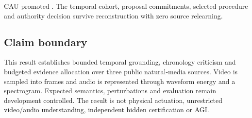 CAU promoted
.
The temporal cohort, proposal commitments, selected procedure and authority
decision survive reconstruction with zero source relearning.

\subsection{Claim boundary}

This result establishes bounded temporal grounding, chronology criticism and
budgeted evidence allocation over three public natural-media sources.  Video is
sampled into frames and audio is represented through waveform energy and a
spectrogram.  Expected semantics, perturbations and evaluation remain
development controlled.  The result is not physical actuation, unrestricted
video/audio understanding, independent hidden certification or AGI.

